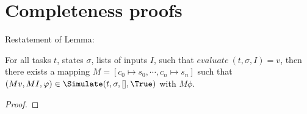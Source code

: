 
\section{Completeness proofs}
\label{sec:completenessproofs}

Restatement of Lemma:

\begin{lemma}
  For all tasks $t$, states $\sigma$, lists of inputs $I$,
  such that $evaluate\ (t,\sigma,I)=v$,
  then there exists a mapping $M = [c_0\mapsto s_0,\cdots,c_n\mapsto s_n]$
  such that $(M v,M I,\phi)\in\Simulate(t,\sigma,[],\True)$ with $M \phi$.
\end{lemma}

\begin{proof}

\end{proof}
